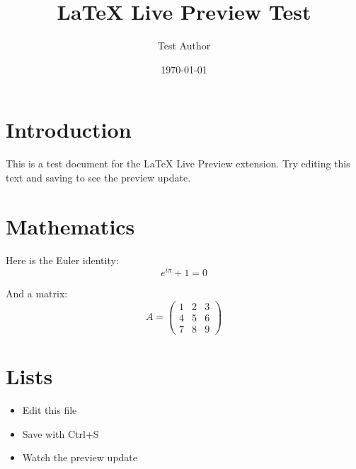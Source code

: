 \documentclass{article}
\title{LaTeX Live Preview Test}
\author{Test Author}
\date{\today}
\begin{document}
\maketitle

\section{Introduction}
This is a test document for the LaTeX Live Preview extension. Try editing this text and saving to see the preview update.

\section{Mathematics}
Here is the Euler identity:
\begin{equation}
  e^{i\pi} + 1 = 0
\end{equation}

And a matrix:
\begin{equation}
  A = \begin{pmatrix}
    1 & 2 & 3 \\
    4 & 5 & 6 \\
    7 & 8 & 9
  \end{pmatrix}
\end{equation}

\section{Lists}
\begin{itemize}
  \item Edit this file
  \item Save with Ctrl+S
  \item Watch the preview update
\end{itemize}
\end{document}
